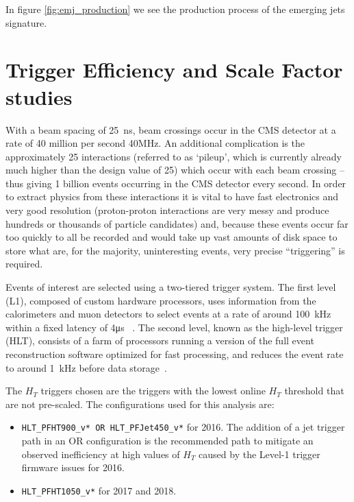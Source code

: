 In figure \ref{fig:emj_production} we see the production process of the emerging jets signature.

\clearpage

\section{Trigger Efficiency and Scale Factor studies}


With a beam spacing of 25~ns, beam crossings occur in the CMS detector at a rate of 40 million per second 40\unit{\MHz}.
An additional complication is the approximately 25 interactions (referred to as `pileup', which is currently already much higher than the design value of 25) which occur with each beam crossing -- thus giving 1 billion events occurring in the CMS detector every second. In order to extract physics from these interactions it is vital to have fast electronics and very good resolution (proton-proton interactions are very messy and produce hundreds or thousands of particle candidates) and, because these events occur far too quickly to all be recorded and would take up vast amounts of disk space to store what are, for the majority, uninteresting events, very precise ``triggering'' is required.

Events of interest are selected using a two-tiered trigger system. The first level (L1), composed of custom hardware processors, uses information from the calorimeters and muon detectors to select events at a rate of around 100~\unit{kHz} within a fixed latency of 4\unit{\us} ~\cite{CMS:2020cmk}. The second level, known as the high-level trigger (HLT), consists of a farm of processors running a version of the full event reconstruction software optimized for fast processing, and reduces the event rate to around 1~\unit{kHz} before data storage~\cite{CMS:2016ngn}.


The $H_T$ triggers chosen are the triggers with the lowest online $H_T$ threshold that are not pre-scaled. The configurations used for this analysis are:

\begin{itemize}
    \item \verb|HLT_PFHT900_v* OR HLT_PFJet450_v*| for 2016. The addition of a jet trigger path in an OR configuration is the recommended path to mitigate an observed inefficiency at high values of $H_T$ caused by the Level-1 trigger firmware issues for 2016.
    \item \verb|HLT_PFHT1050_v*| for 2017 and 2018.
\end{itemize}

